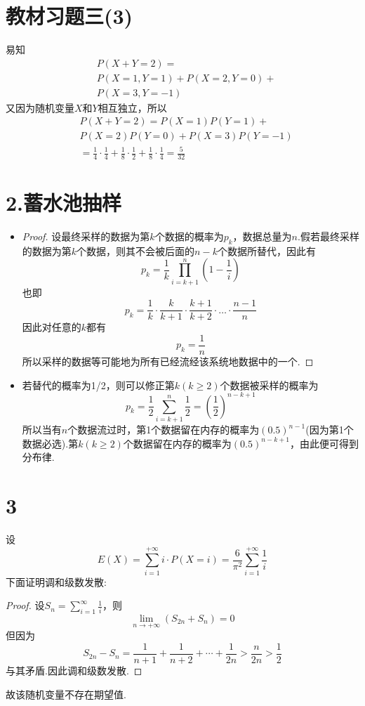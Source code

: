 \documentclass[twocolumn]{article}
\begin{document}
\begin{CJK}{UTF8}{gbsn}
			\section*{教材习题三(3)}
				易知\begin{align*}
					& P(X+Y=2)= \\&  P(X=1,Y=1)+P(X=2,Y=0)+\\& P(X=3,Y=-1)
				\end{align*}又因为随机变量$X$和$Y$相互独立，所以\begin{align*}
					& P(X+Y=2) = P(X=1)P(Y=1)+ \\ & P(X=2)P(Y=0)+P(X=3)P(Y=-1) \\
					         & = \frac{1}{4}\cdot\frac{1}{4}+\frac{1}{8}\cdot\frac{1}{2}+\frac{1}{8}\cdot\frac{1}{4}=\frac{5}{32}
				\end{align*}
			\section*{2.蓄水池抽样}
				\begin{itemize}
					\item \begin{proof}
						设最终采样的数据为第$k$个数据的概率为$p_k$，数据总量为$n$.假若最终采样的数据为第$k$个数据，则其不会被后面的$n-k$个数据所替代，因此有\[p_k=\frac{1}{k}\prod_{i=k+1}^{n}(1-\frac{1}{i})\]也即\[p_k=\frac{1}{k}\cdot\frac{k}{k+1}\cdot\frac{k+1}{k+2}\cdot\dots\cdot\frac{n-1}{n}\]因此对任意的$k$都有\[p_k=\frac{1}{n}\]所以采样的数据等可能地为所有已经流经该系统地数据中的一个.
					\end{proof}
					\item 若替代的概率为1/2，则可以修正第$k(k\ge2)$个数据被采样的概率为\[p_k=\frac{1}{2}\sum_{i=k+1}^{n}\frac{1}{2}=(\frac{1}{2})^{n-k+1}\]所以当有$n$个数据流过时，第1个数据留在内存的概率为$(0.5)^{n-1}$(因为第1个数据必选).第$k(k\ge2)$个数据留在内存的概率为$(0.5)^{n-k+1}$，由此便可得到分布律.
				\end{itemize}
			\section*{3}
				设\[E(X)=\sum_{i=1}^{+\infty}i\cdot P(X=i)=\frac{6}{\pi^2}\sum_{i=1}^{+\infty}\frac{1}{i}\]下面证明调和级数发散:\begin{proof}
					设$S_n = \sum_{i=1}^{\infty}\frac{1}{i}$，则\[\lim\limits_{n\to+\infty}(S_{2n}+S_n)=0\]但因为\[S_{2n}-S_n=\frac{1}{n+1}+\frac{1}{n+2}+\cdots+\frac{1}{2n}>\frac{n}{2n}>\frac{1}{2}\]与其矛盾.因此调和级数发散.
				\end{proof}
				故该随机变量不存在期望值.

\end{CJK}
\end{document}
